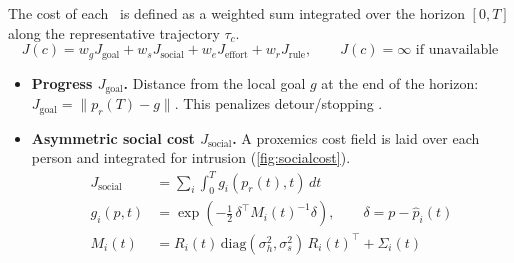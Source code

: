 The cost of each \Class\ is defined as a weighted sum integrated over the horizon $[0,T]$ along the representative trajectory $\tau_c$.
\begin{equation}\label{eq:cost}
J(c) = w_g J_{\text{goal}} + w_s J_{\text{social}} + w_e J_{\text{effort}} + w_r J_{\text{rule}}, \qquad J(c) = \infty \text{ if unavailable}
\end{equation}

\begin{itemize}
\item \textbf{Progress $J_{\text{goal}}$.} Distance from the local goal $g$ at the end of the horizon: $J_{\text{goal}} = \lVert p_r(T) - g \rVert$. This penalizes detour/stopping .
\item \textbf{Asymmetric social cost $J_{\text{social}}$.} A proxemics cost field is laid over each person and integrated for intrusion (\cref{fig:socialcost}).
\begin{align}
J_{\text{social}} &= \sum_i \int_0^T g_i(p_r(t), t)\, dt \\
g_i(p,t) &= \exp\!\left(-\tfrac{1}{2}\, \delta^\top M_i(t)^{-1} \delta\right), \qquad \delta = p - \hat p_i(t) \\
M_i(t) &= R_i(t)\, \mathrm{diag}(\sigma_h^2, \sigma_s^2)\, R_i(t)^\top + \Sigma_i(t)
\end{align}


\end{itemize}
